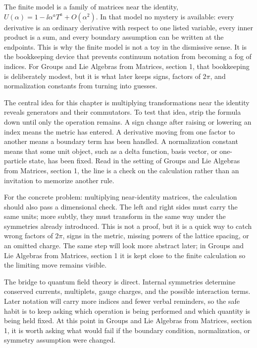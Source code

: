 The finite model is a family of matrices near the identity, \(U(\alpha)=1-\ii\alpha^aT^a+O(\alpha^2)\).  In that model no mystery is available: every derivative is an ordinary derivative with respect to one listed variable, every inner product is a sum, and every boundary assumption can be written at the endpoints.  This is why the finite model is not a toy in the dismissive sense.  It is the bookkeeping device that prevents continuum notation from becoming a fog of indices.  For Groups and Lie Algebras from Matrices, section 1, that bookkeeping is deliberately modest, but it is what later keeps signs, factors of \(2\pi\), and normalization constants from turning into guesses.

The central idea for this chapter is multiplying transformations near the identity reveals generators and their commutators.  To test that idea, strip the formula down until only the operation remains.  A sign change after raising or lowering an index means the metric has entered.  A derivative moving from one factor to another means a boundary term has been handled.  A normalization constant means that some unit object, such as a delta function, basis vector, or one-particle state, has been fixed.  Read in the setting of Groups and Lie Algebras from Matrices, section 1, the line is a check on the calculation rather than an invitation to memorize another rule.

For the concrete problem: multiplying near-identity matrices, the calculation should also pass a dimensional check.  The left and right sides must carry the same units; more subtly, they must transform in the same way under the symmetries already introduced.  This is not a proof, but it is a quick way to catch wrong factors of \(2\pi\), signs in the metric, missing powers of the lattice spacing, or an omitted charge.  The same step will look more abstract later; in Groups and Lie Algebras from Matrices, section 1 it is kept close to the finite calculation so the limiting move remains visible.

The bridge to quantum field theory is direct.  Internal symmetries determine conserved currents, multiplets, gauge charges, and the possible interaction terms.  Later notation will carry more indices and fewer verbal reminders, so the safe habit is to keep asking which operation is being performed and which quantity is being held fixed.  At this point in Groups and Lie Algebras from Matrices, section 1, it is worth asking what would fail if the boundary condition, normalization, or symmetry assumption were changed.

